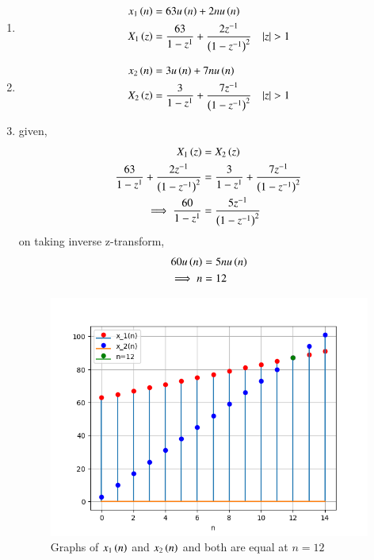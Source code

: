 \documentclass[journal,12pt,twocolumn]{IEEEtran}
\theoremstyle{remark}
\begin{document}
\begin{enumerate}
\item
\begin{align}
x_1\brak{n} &= 63u\brak{n} + 2nu\brak{n} \label{eq:3}\\
X_1\brak{z} &= \frac{63}{1-z^{1}} + \frac{2z^{-1}}{\brak{1-z^{-1}}^{2}}  \quad |z|>1
\end{align}
\item
\begin{align}
x_2\brak{n} &= 3u\brak{n} + 7nu\brak{n} \label{eq:4}\\ 
X_2\brak{z} &= \frac{3}{1-z^{1}} + \frac{7z^{-1}}{\brak{1-z^{-1}}^{2}} \quad |z|>1
\end{align}
\item

given,
\begin{align}
X_1\left(z\right) &= X_2\left(z\right)\\
\frac{63}{1-z^{1}} + \frac{2z^{-1}}{\left(1-z^{-1}\right)^{2}} &=\frac{3}{1-z^{1}} + \frac{7z^{-1}}{\left(1-z^{-1}\right)^{2}}\\
\implies \frac{60}{1-z^{1}}&=\frac{5z^{-1}}{\left(1-z^{-1}\right)^{2}}
\end{align}
on taking inverse z-transform,\\
\begin{align}
    60u\left(n\right) &= 5nu\left(n\right)\\
    \implies n &=12
\end{align}
\begin{figure}[h!]
    \includegraphics[width = \columnwidth]{Figure_1.png}
    \caption{Graphs of $ x_1\left(n\right)$ and $ x_2\left(n\right)$ and both are equal at $ n=12$}
    \label{fig: 1}
\end{figure}
\end{enumerate}
\end{document}
